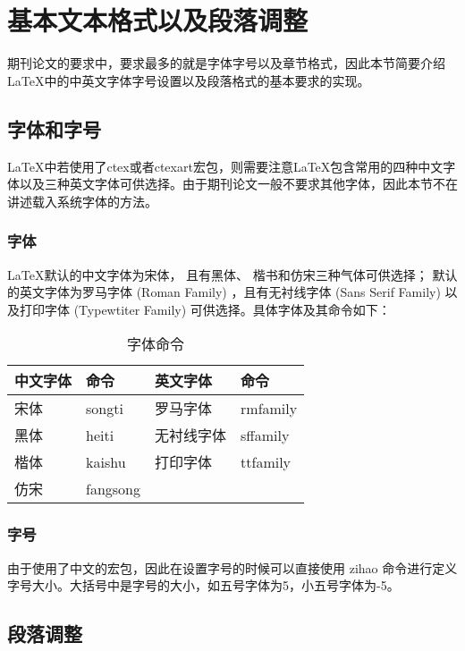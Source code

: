 \section{基本文本格式以及段落调整}	%
期刊论文的要求中，要求最多的就是字体字号以及章节格式，因此本节简要介绍\LaTeX 中的中英文字体字号设置以及段落格式的基本要求的实现。

\subsection{字体和字号}	%
\LaTeX 中若使用了ctex或者ctexart宏包，则需要注意\LaTeX 包含常用的四种中文字体以及三种英文字体可供选择。由于期刊论文一般不要求其他字体，因此本节不在讲述载入系统字体的方法。

\subsubsection{字体}%
\LaTeX 默认的中文字体为宋体， 且有黑体、 楷书和仿宋三种气体可供选择； 默认的英文字体为罗马字体 (Roman Family) ，且有无衬线字体 (Sans Serif Family) 以及打印字体 (Typewtiter Family) 可供选择。具体字体及其命令如下：

\begin{table}[htbp]  

	\caption{字体命令} \label{字体命令}
	\centering
	\begin{tabular}{l p{3cm}<{\raggedleft} l p{3cm}<{\centering}}
		\toprule
		中文字体&命令& 英文字体& 命令\\
		\hline
		宋体&	songti&	罗马字体& rmfamily\\
		黑体	& heiti &	无衬线字体 &	sffamily\\
		楷体 &	kaishu &	打印字体& 	ttfamily\\
		仿宋& fangsong & \\
		\hline
	\end{tabular}
\end{table}
	
\subsubsection{字号}
由于使用了中文的宏包，因此在设置字号的时候可以直接使用 zihao 命令进行定义字号大小。大括号中是字号的大小，如五号字体为5，小五号字体为-5。


\subsection{段落调整}
